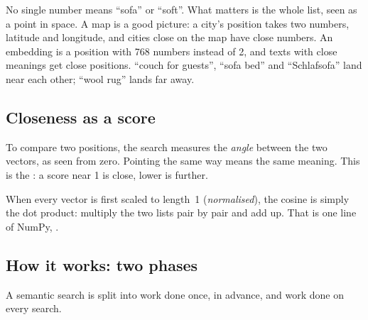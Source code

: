 \documentclass[11pt]{article}
\begin{document}
No single number means ``sofa'' or ``soft''. What matters is the whole
list, seen as a point in space. A map is a good picture: a city's
position takes two numbers, latitude and longitude, and cities close on
the map have close numbers. An embedding is a position with 768
numbers instead of 2, and texts with close meanings get close
positions. ``couch for guests'', ``sofa bed'' and ``Schlafsofa'' land
near each other; ``wool rug'' lands far away.

\subsection{Closeness as a score}

To compare two positions, the search measures the \emph{angle} between
the two vectors, as seen from zero. Pointing the same way means the
same meaning. This is the : a score near 1 is close, lower is further.

When every vector is first scaled to length~1 (\emph{normalised}), the
cosine is simply the dot product: multiply the two lists pair by pair
and add up. That is one line of NumPy, .

\subsection{How it works: two phases}

A semantic search is split into work done once, in advance, and work
done on every search.
\end{document}
